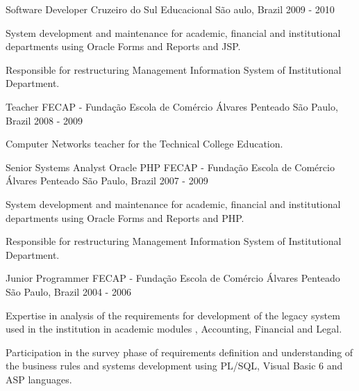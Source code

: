 \begin{cventries}
  \cventry
    {Software Developer} %
    {Cruzeiro do Sul Educacional} %
    {São aulo, Brazil} %
    {2009 - 2010} %
    {
      \begin{cvitems} %
        \item {System development and maintenance for academic, financial and institutional departments using Oracle Forms and Reports and JSP.}
        \item {Responsible for restructuring Management Information System of Institutional Department.}
      \end{cvitems}
    }

  \cventry
    {Teacher} %
    {FECAP - Fundação Escola de Comércio Álvares Penteado} %
    {São Paulo, Brazil} %
    {2008 - 2009} %
    {
      \begin{cvitems} %
        \item {Computer Networks teacher for the Technical College Education.}
      \end{cvitems}
    }

  \cventry
    {Senior Systems Analyst Oracle PHP} %
    {FECAP - Fundação Escola de Comércio Álvares Penteado} %
    {São Paulo, Brazil} %
    {2007 - 2009} %
    {
      \begin{cvitems} %
        \item {System development and maintenance for academic, financial and institutional departments using Oracle Forms and Reports and PHP.}
       \item{Responsible for restructuring Management Information System of Institutional Department.}
      \end{cvitems}
    }

  \cventry
    {Junior Programmer} %
    {FECAP - Fundação Escola de Comércio Álvares Penteado} %
    {São Paulo, Brazil} %
    {2004 - 2006} %
    {
      \begin{cvitems} %
        \item {Expertise in analysis of the requirements for development of the legacy system used in the institution in academic modules , Accounting, Financial and Legal.}
        \item {Participation in the survey phase of requirements definition and understanding of the business rules and systems development using PL/SQL, Visual Basic 6 and ASP languages.}
      \end{cvitems}
    }


\end{cventries}
